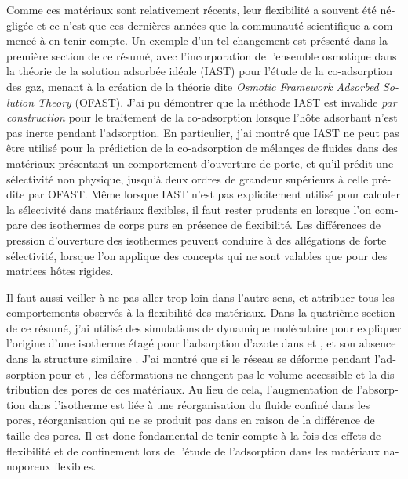 \documentclass[thesis]{subfiles}
\begin{document}
\begin{otherlanguage}{french}
Comme ces matériaux sont relativement récents, leur flexibilité a souvent été
négligée et ce n'est que ces dernières années que la communauté scientifique a
commencé à en tenir compte. Un exemple d'un tel changement est présenté dans la
première section de ce résumé, avec l'incorporation de l'ensemble osmotique dans
la théorie de la solution adsorbée idéale (IAST) pour l'étude de la
co-adsorption des gaz, menant à la création de la théorie dite \emph{Osmotic
Framework Adsorbed Solution Theory} (OFAST). J'ai pu démontrer que la méthode
IAST est invalide \emph{par construction} pour le traitement de la co-adsorption
lorsque l'hôte adsorbant n'est pas inerte pendant l'adsorption. En particulier,
j'ai montré que IAST ne peut pas être utilisé pour la prédiction de la
co-adsorption de mélanges de fluides dans des matériaux présentant un
comportement d'ouverture de porte, et qu'il prédit une sélectivité non physique,
jusqu'à deux ordres de grandeur supérieurs à celle prédite par OFAST. Même
lorsque IAST n'est pas explicitement utilisé pour calculer la sélectivité dans
matériaux flexibles, il faut rester prudents en lorsque l'on compare des
isothermes de corps purs en présence de flexibilité. Les différences de pression
d'ouverture des isothermes peuvent conduire à des allégations de forte
sélectivité, lorsque l'on applique des concepts qui ne sont valables que pour
des matrices hôtes rigides.

Il faut aussi veiller à ne pas aller trop loin dans l'autre sens, et attribuer
tous les comportements observés à la flexibilité des matériaux. Dans la
quatrième section de ce résumé, j'ai utilisé des simulations de dynamique
moléculaire \abinitio pour expliquer l'origine d'une isotherme étagé pour
l'adsorption d'azote dans  et \ZIFCl, et son absence dans la structure
similaire \ZIFBr. J'ai montré que si le réseau se déforme pendant l'adsorption
pour  et \ZIFCl, les déformations ne changent pas le volume accessible et
la distribution des pores de ces matériaux. Au lieu de cela, l'augmentation de
l'absorption dans l'isotherme est liée à une réorganisation du fluide confiné
dans les pores, réorganisation qui ne se produit pas dans \ZIFBr en raison de la
différence de taille des pores. Il est donc fondamental de tenir compte à la
fois des effets de flexibilité et de confinement lors de l'étude de l'adsorption
dans les matériaux nanoporeux flexibles.


\end{otherlanguage}
\end{document}
